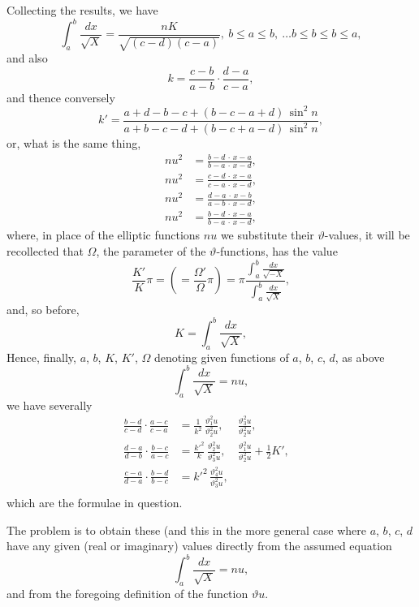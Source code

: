 \documentclass[11pt,a4paper]{book}
\begin{document}
Collecting the results, we have
\[
\int_a^b\frac{dx}{\sqrt{X}}=\frac{nK}{\sqrt{(c-d)(c-a)}}, \ b\le a\le b,\ \dots b\le b\le b\le a,
\]
and also
\[
k=\frac{c-b}{a-b}\cdot\frac{d-a}{c-a},
\]
and thence conversely
\[
k'=\frac{a+d-b-c+(b-c-a+d)\,\sin^2 n}{a+b-c-d+(b-c+a-d)\,\sin^2 n},
\]
or, what is the same thing,
\begin{align*}
nu^2&=\frac{b-d\,\cdot\,x-a}{b-a\,\cdot\,x-d},\\
nu^2&=\frac{c-d\,\cdot\,x-a}{c-a\,\cdot\,x-d},\\
nu^2&=\frac{d-a\,\cdot\,x-b}{a-b\,\cdot\,x-d},\\
nu^2&=\frac{b-d\,\cdot\,x-a}{b-a\,\cdot\,x-d},
\end{align*}
where, in place of the elliptic functions $nu$ we substitute their $\vartheta$-values, it will be recollected that $\Omega$, the parameter of the $\vartheta$-functions, has the value
\[
\frac{K'}{K}\pi=\left(=\frac{\Omega'}{\Omega}\pi\right)=\pi\frac{\int_a^b\frac{dx}{\sqrt{-X}}}{\int_a^b\frac{dx}{\sqrt{X}}},
\]
and, so before,
\[
K=\int_a^b\frac{dx}{\sqrt{X}},
\]
Hence, finally, $a$, $b$, $K$, $K'$, $\Omega$ denoting given functions of $a$, $b$, $c$, $d$, as above
\[
\int_a^b\frac{dx}{\sqrt{X}}=nu,
\]
we have severally
\begin{align*}
\frac{b-d}{c-d}\cdot\frac{a-c}{c-a}&=\frac{1}{k^2}\,\frac{\vartheta_1^2 u}{\vartheta_2^2 u},&\frac{\vartheta_3^2 u}{\vartheta_2^2 u},&\\
\frac{d-a}{d-b}\cdot\frac{b-c}{a-c}&=\frac{k'^2}{k}\,\frac{\vartheta_2^2 u}{\vartheta_3^2 u},& \frac{\vartheta_1^2 u}{\vartheta_2^2 u}+\tfrac{1}{2}K',\\
\frac{c-a}{d-a}\cdot\frac{b-d}{b-c}&=k'^2\,\frac{\vartheta_4^2 u}{\vartheta_3^2 u},&\\
\end{align*}
which are the formulae in question.

\newpage
The problem is to obtain these (and this in the more general case where $a$, $b$, $c$, $d$ have any given (real or imaginary) values directly from the assumed equation
\[
\int_a^b\frac{dx}{\sqrt{X}}=nu,
\]
and from the foregoing definition of the function $\vartheta u$.
\end{document}
